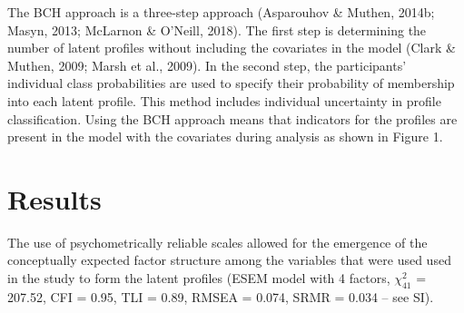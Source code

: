 \documentclass[
  man]{apa7}
\begin{document}
The BCH approach is a three-step approach (Asparouhov \& Muthen, 2014b; Masyn, 2013; McLarnon \& O'Neill, 2018). The first step is determining the number of latent profiles without including the covariates in the model (Clark \& Muthen, 2009; Marsh et al., 2009). In the second step, the participants' individual class probabilities are used to specify their probability of membership into each latent profile. This method includes individual uncertainty in profile classification. Using the BCH approach means that indicators for the profiles are present in the model with the covariates during analysis as shown in Figure 1.

\hypertarget{results}{%
\section{Results}\label{results}}

The use of psychometrically reliable scales allowed for the emergence of the conceptually expected factor structure among the variables that were used used in the study to form the latent profiles (ESEM model with 4 factors, \(\chi^2_{41}\) = 207.52, CFI = 0.95, TLI = 0.89, RMSEA = 0.074, SRMR = 0.034 -- see SI).
\end{document}
